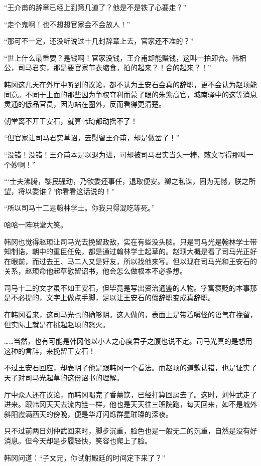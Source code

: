 “王介甫的辞章已经上到第几道了？他是不是铁了心要走？”

“走个鬼啊！也不想想官家会不会放人！”

“那可不一定，还没听说过十几封辞章上去，官家还不准的？”

“世上什么最重要？是钱啊！官家没钱，王介甫却能赚钱，这叫一拍即合。韩相公，司马君实，那是要官家节衣缩食，拍的起来？！合的起来？！”

韩冈这几天在外厅中听到的议论，都不认为王安石会真的辞职，更不会认为赵顼能同意。不同于上面的那些因为争权夺利而蒙了眼的朱紫高官，城南驿中的这等消息灵通的低品官员，因为站在圈外，反而看得更清楚。

朝堂离不开王安石，就算韩琦都动摇不了！

“但官家让司马君实草诏，去慰留王介甫，却是做岔了！”

“没错！没错！王介甫本是以退为进，可却被司马君实当头一棒，敇文写得那叫一个妙啊！”

“‘士夫沸腾，黎民骚动，乃欲委还事任，退取便安。卿之私谋，固为无憾，朕之所望，将以委谁？’你看看这话说的！”

“所以司马十二是翰林学士。你我只得混吃等死。”

哈哈一阵哄堂大笑。

韩冈也觉得赵顼让司马光去挽留政敌，实在有些没头脑。只是司马光是翰林学士带知制诰，朝中的重臣任免，都是通过翰林学士起草的。赵顼大概是看了司马光正好在眼前，而过去王、马二人又是好友，所以找他来写。但以现在司马光和王安石的关系，赵顼命他起草慰留诏书，他会怎么做根本不必多想。

司马十二的文才虽不如王安石，但毕竟是写出资治通鉴的人物。字寓褒贬的本事那是不必提的，文字上做点手脚，足以让王安石的假辞职变成真辞职。

在韩冈看来，这司马光也的确够阴。这人做的，表面上是带着嗔怪的语气在挽留，但实际上就是在挑起赵顼的怒火。

……当然，也有可能是韩冈他以小人之心度君子之腹也说不定。司马光真的是想用这种的言辞，来挽留王安石！

不过王安石回应，却表明了他是跟韩冈一个看法。而赵顼的道歉认错，也是证实了天子对司马光起草的这份诏书的理解。

厅中众人还在议论，而韩冈喝完了香薷饮，已经打算回房去了。这时，刘仲武走了进来。跟韩冈天天去流内铨一样，他也是天天往三班院跑，每天回来，如不是城外斜阳霞满西天的傍晚，便是华灯闪烁群星璀璨的深夜。

只不过前两日刘仲武回来时，脚步沉重，脸色也是一般无二的沉重，自然是没有好消息。但今天却是步履轻快，笑容也爬上了脸。

韩冈问道：“子文兄，你试射殿廷的时间定下来了？”

